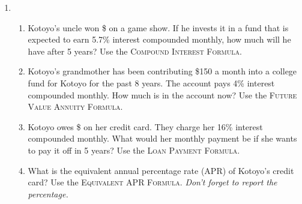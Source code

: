 \begin{enumerate}
\newpage %

 \item  \begin{enumerate} 
\item Kotoyo's uncle won \$ on a game show.  If he invests it in a fund that is expected to earn 5.7\% interest compounded monthly, how much will he have after 5 years? Use the \textsc{Compound Interest Formula}.  \vfill 
\item Kotoyo's grandmother has been contributing \$150 a month into a college fund for Kotoyo for the past 8 years.  The account pays 4\% interest compounded monthly.  How much is in the account now? Use the \textsc{Future Value Annuity Formula}. \vfill  
\item Kotoyo owes \$ on her credit card.  They charge her 16\% interest compounded monthly.  What would her monthly payment be if she wants to pay it off in 5 years? Use the \textsc{Loan Payment Formula}.  \vfill 
\item What is the equivalent annual percentage rate (APR) of Kotoyo's credit card? Use the \textsc{Equivalent APR Formula}.  \emph{Don't forget to report the percentage.} \vfill 
\end{enumerate} 


\end{enumerate}

